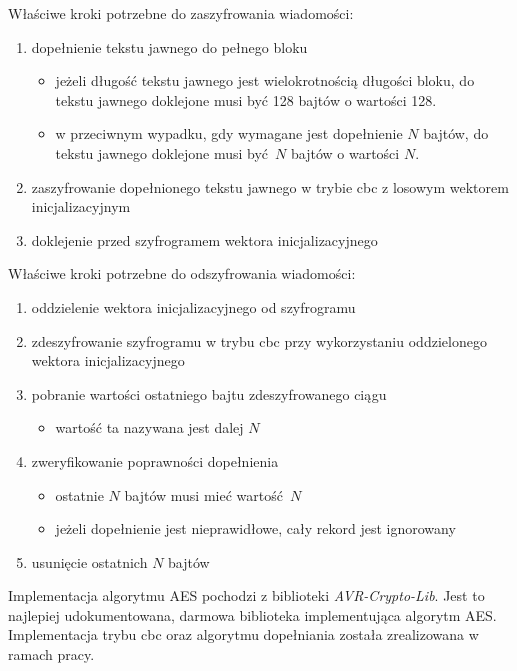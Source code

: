 Właściwe kroki potrzebne do zaszyfrowania wiadomości:

\begin{enumerate}
\item dopełnienie tekstu jawnego do pełnego bloku
\begin{itemize}
\item jeżeli długość tekstu jawnego jest wielokrotnością długości bloku, do tekstu jawnego doklejone musi być 128 bajtów o wartości 128.
\item w przeciwnym wypadku, gdy wymagane jest dopełnienie $ N $ bajtów, do tekstu jawnego doklejone musi być $ N $ bajtów o wartości $ N $.
\end{itemize}
\item zaszyfrowanie dopełnionego tekstu jawnego w trybie \gls{cbc} z losowym wektorem inicjalizacyjnym
\item doklejenie przed szyfrogramem wektora inicjalizacyjnego
\end{enumerate}

Właściwe kroki potrzebne do odszyfrowania wiadomości:

\begin{enumerate}
\item oddzielenie wektora inicjalizacyjnego od szyfrogramu
\item zdeszyfrowanie szyfrogramu w trybu \gls{cbc} przy wykorzystaniu oddzielonego wektora inicjalizacyjnego
\item pobranie wartości ostatniego bajtu zdeszyfrowanego ciągu
\begin{itemize}
    \item wartość ta nazywana jest dalej $ N $
\end{itemize}
\item zweryfikowanie poprawności dopełnienia
\begin{itemize}
\item ostatnie $ N $ bajtów musi mieć wartość $ N $
\item jeżeli dopełnienie jest nieprawidłowe, cały rekord jest ignorowany
\end{itemize}
\item usunięcie ostatnich $ N $ bajtów
\end{enumerate}

Implementacja algorytmu AES pochodzi z biblioteki \emph{AVR-Crypto-Lib}. Jest to najlepiej udokumentowana, darmowa biblioteka implementująca algorytm AES. Implementacja trybu \gls{cbc} oraz algorytmu dopełniania została zrealizowana w ramach pracy.


